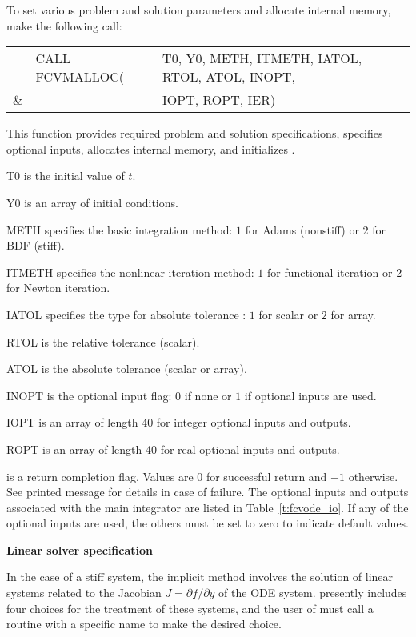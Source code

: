 \begin{Steps}
  To set various problem and solution parameters and allocate
  internal memory, make the following call:
  {
    \begin{tabular}[t]{@{}r@{}l@{}l}
        &CALL FCVMALLOC(&T0, Y0, METH, ITMETH, IATOL, RTOL, ATOL, INOPT, \\
    {\&}&               &IOPT, ROPT, IER)
    \end{tabular}
  }
  {
    This function provides required problem and solution specifications, 
    specifies optional inputs,
    allocates internal memory, and initializes {\cvode}.
  }
  {
    \begin{args}[ITMETH]
    \item[T0] is the initial value of $t$.
    \item[Y0] is an array of initial conditions.
    \item[METH] specifies the  basic integration method: 
      $1$ for Adams (nonstiff) or $2$ for BDF (stiff).
    \item[ITMETH] specifies the nonlinear iteration method: 
      $1$ for functional iteration or $2$ for Newton iteration.
    \item[IATOL] specifies the type for absolute tolerance :
      $1$ for scalar or $2$ for array.
    \item[RTOL] is the relative tolerance (scalar).
    \item[ATOL] is the absolute tolerance (scalar or array).
    \item[INOPT] is the optional input flag: $0$ if none or $1$ if optional 
      inputs are used.
    \item[IOPT] is an array of length 40 for integer optional inputs and outputs.
    \item[ROPT] is an array of length 40 for real optional inputs and outputs.
    \end{args}
  }
  {
     is a return completion flag.  Values are $0$ for successful return
    and $-1$ otherwise. See printed message for details in case of failure.
  }
  {
    The optional inputs and outputs associated with the main {\cvode} integrator
    are listed in Table~\ref{t:fcvode_io}.
    If any of the optional inputs are used, the others must be set
    to zero to indicate default values.
  }

\item\label{i:fcvode_lin_solv_spec} {\bf Linear solver specification} 
  
  In the case of a stiff system, the implicit  method involves the solution
  of linear systems related to the Jacobian $J = \partial f / \partial y$
  of the ODE system.  {\cvode} presently includes four choices for the treatment
  of these systems, and the user of {\fcvode} must call a routine with a
  specific name to make the desired choice.


\end{Steps}
